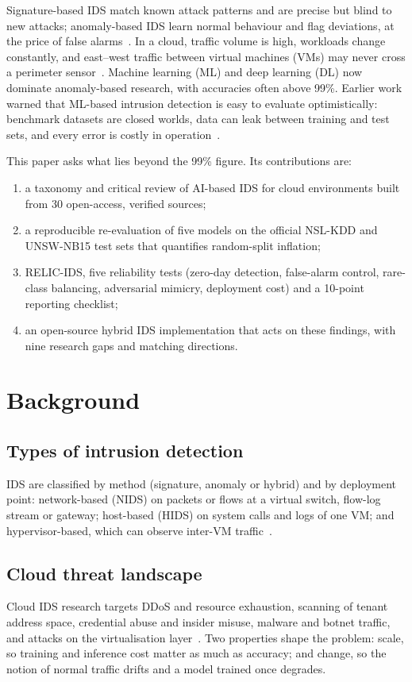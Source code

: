 \documentclass[conference]{IEEEtran}
\begin{document}
Signature-based IDS match known attack patterns and are precise but blind to new attacks; anomaly-based IDS learn normal behaviour and flag deviations, at the price of false alarms~\cite{khraisat2019,ahmad2021}. In a cloud, traffic volume is high, workloads change constantly, and east--west traffic between virtual machines (VMs) may never cross a perimeter sensor~\cite{nasim2025}. Machine learning (ML) and deep learning (DL) now dominate anomaly-based research, with accuracies often above 99\%. Earlier work warned that ML-based intrusion detection is easy to evaluate optimistically: benchmark datasets are closed worlds, data can leak between training and test sets, and every error is costly in operation~\cite{sommer2010,arp2022}.

This paper asks what lies beyond the 99\% figure. Its contributions are:
\begin{enumerate}
\item a taxonomy and critical review of AI-based IDS for cloud environments built from 30 open-access, verified sources;
\item a reproducible re-evaluation of five models on the official NSL-KDD and UNSW-NB15 test sets that quantifies random-split inflation;
\item RELIC-IDS, five reliability tests (zero-day detection, false-alarm control, rare-class balancing, adversarial mimicry, deployment cost) and a 10-point reporting checklist;
\item an open-source hybrid IDS implementation that acts on these findings, with nine research gaps and matching directions.
\end{enumerate}

\section{Background}
\subsection{Types of intrusion detection}
IDS are classified by method (signature, anomaly or hybrid) and by deployment point: network-based (NIDS) on packets or flows at a virtual switch, flow-log stream or gateway; host-based (HIDS) on system calls and logs of one VM; and hypervisor-based, which can observe inter-VM traffic~\cite{khraisat2019,ahmad2021,nasim2025}.

\subsection{Cloud threat landscape}
Cloud IDS research targets DDoS and resource exhaustion, scanning of tenant address space, credential abuse and insider misuse, malware and botnet traffic, and attacks on the virtualisation layer~\cite{nasim2025,pintoneto2025}. Two properties shape the problem: scale, so training and inference cost matter as much as accuracy; and change, so the notion of normal traffic drifts and a model trained once degrades.
\end{document}
